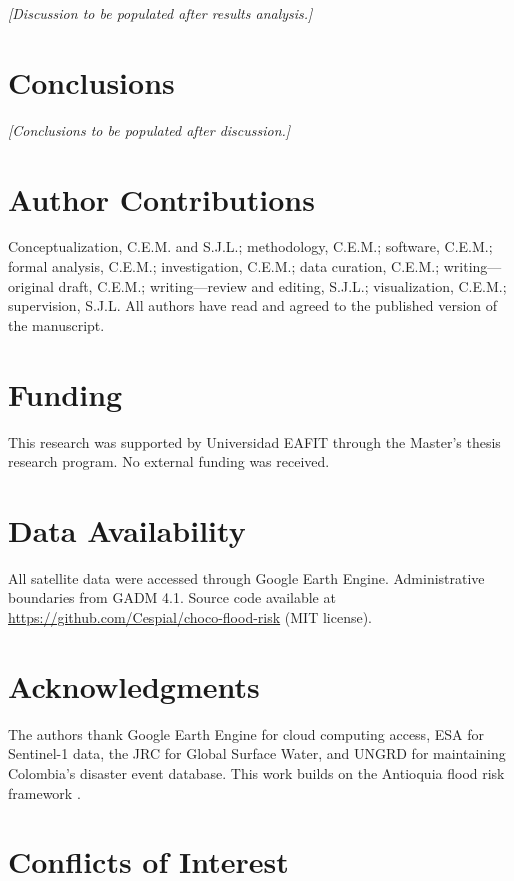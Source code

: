 \documentclass{article}
\begin{document}
\textit{[Discussion to be populated after results analysis.]}

\section{Conclusions}
\label{sec:conclusions}

\textit{[Conclusions to be populated after discussion.]}

\section*{Author Contributions}

Conceptualization, C.E.M. and S.J.L.; methodology, C.E.M.; software, C.E.M.; formal analysis, C.E.M.; investigation, C.E.M.; data curation, C.E.M.; writing---original draft, C.E.M.; writing---review and editing, S.J.L.; visualization, C.E.M.; supervision, S.J.L. All authors have read and agreed to the published version of the manuscript.

\section*{Funding}

This research was supported by Universidad EAFIT through the Master's thesis research program. No external funding was received.

\section*{Data Availability}

All satellite data were accessed through Google Earth Engine. Administrative boundaries from GADM 4.1. Source code available at \url{https://github.com/Cespial/choco-flood-risk} (MIT license).

\section*{Acknowledgments}

The authors thank Google Earth Engine for cloud computing access, ESA for Sentinel-1 data, the JRC for Global Surface Water, and UNGRD for maintaining Colombia's disaster event database. This work builds on the Antioquia flood risk framework \citep{EspinalMaya2026}.

\section*{Conflicts of Interest}
\end{document}
